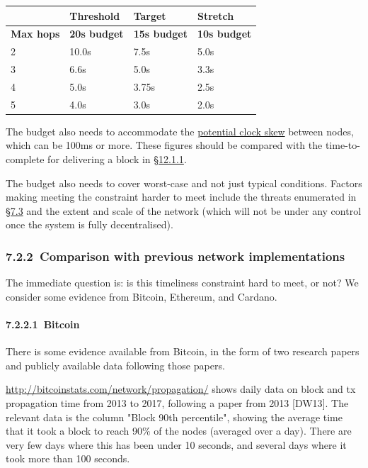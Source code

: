\documentclass[11pt,a4paper]{article}
\begin{document}
\begin{longtable}[]{@{}llll@{}}
\toprule
& Threshold & Target & Stretch\tabularnewline
\midrule
\endhead
\textbf{Max hops} & \textbf{20s budget} & \textbf{15s budget} &
\textbf{10s budget}\tabularnewline
2 & 10.0s & 7.5s & 5.0s\tabularnewline
3 & 6.6s & 5.0s & 3.3s\tabularnewline
4 & 5.0s & 3.75s & 2.5s\tabularnewline
5 & 4.0s & 3.0s & 2.0s\tabularnewline
\bottomrule
\end{longtable}

The budget also needs to accommodate the
\protect\hyperlink{time-synchronisation-constraints}{{potential clock
skew}} between nodes, which can be 100ms or more. These figures should
be compared with the time-to-complete for delivering a block in
\protect\hyperlink{time-to-transmit-a-block-of-given-size-across-given-latencies}{{§12.1.1}}.

The budget also needs to cover worst-case and not just typical
conditions. Factors making meeting the constraint harder to meet include
the threats enumerated in
\protect\hyperlink{high-level-threat-model}{{§7.3}} and the extent and
scale of the network (which will not be under any control once the
system is fully decentralised).

\hypertarget{comparison-with-previous-network-implementations}{%
\subsubsection{​7.2.2​~Comparison with previous network
implementations}\label{comparison-with-previous-network-implementations}}

The immediate question is: is this timeliness constraint hard to meet,
or not? We consider some evidence from Bitcoin, Ethereum, and Cardano.

\hypertarget{bitcoin}{%
\paragraph{​7.2.2.1​~Bitcoin}\label{bitcoin}}

There is some evidence available from Bitcoin, in the form of two
research papers and publicly available data following those papers.

\href{http://bitcoinstats.com/network/propagation/}{{http://bitcoinstats.com/network/propagation/}}
shows daily data on block and tx propagation time from 2013 to 2017,
following a paper from 2013 {[}DW13{]}. The relevant data is the column
"Block 90th percentile", showing the average time that it took a block
to reach 90\% of the nodes (averaged over a day). There are very few
days where this has been under 10 seconds, and several days where it
took more than 100 seconds.
\end{document}
